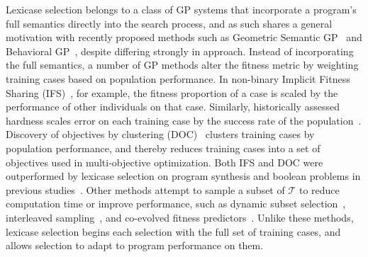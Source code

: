 \documentclass[twoside]{article}
\begin{document}
Lexicase selection belongs to a class of GP systems that incorporate a program's full semantics directly into the search process, and as such shares a general motivation with recently proposed methods such as Geometric Semantic GP~\citep{moraglio_geometric_2012} and Behavioral GP~\citep{krawiec_behavioral_2014}, despite differing strongly in approach. Instead of incorporating the full semantics, a number of GP methods alter the fitness metric by weighting training cases based on population performance. In non-binary Implicit Fitness Sharing (IFS)~\citep{krawiec_implicit_2013}, for example, the fitness proportion of a case is scaled by the performance of other individuals on that case. Similarly, historically assessed hardness scales error on each training case by the success rate of the population~\citep{klein_genetic_2008}. Discovery of objectives by clustering (DOC)~\citep{krawiec_automatic_2015} clusters training cases by population performance, and thereby reduces training cases into a set of objectives used in multi-objective optimization. Both IFS and DOC were outperformed by lexicase selection on program synthesis and boolean problems in previous studies~\citep{helmuth_general_2015-1,liskowski_comparison_2015}. Other methods attempt to sample a subset of $\mathcal{T}$ to reduce computation time or improve performance, such as dynamic subset selection~\citep{gathercole_dynamic_1994}, interleaved sampling~\citep{goncalves_balancing_2013}, and co-evolved fitness predictors~\citep{schmidt_coevolution_2008}. Unlike these methods, lexicase selection begins each selection with the full set of training cases, and allows selection to adapt to program performance on them.
\end{document}
